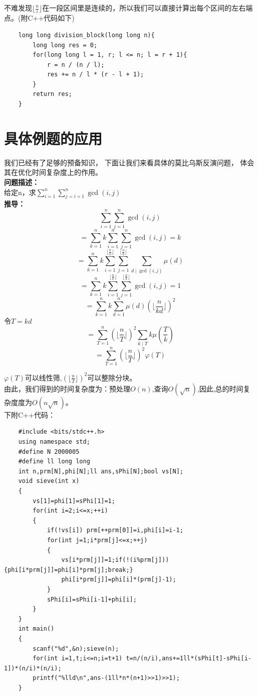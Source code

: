 \documentclass{hfutreport}
\begin{document}
不难发现$\lfloor \frac{n}{i} \rfloor$在一段区间里是连续的，所以我们可以直接计算出每个区间的左右端点。(附C++代码如下)\\
\begin{lstlisting}
    long long division_block(long long n){
        long long res = 0;
        for(long long l = 1, r; l <= n; l = r + 1){
            r = n / (n / l);
            res += n / l * (r - l + 1);
        }
        return res;
    }
\end{lstlisting}


\section{具体例题的应用}

我们已经有了足够的预备知识，
下面让我们来看具体的莫比乌斯反演问题，
体会其在优化时间复杂度上的作用。\\

\textbf{问题描述：}\\

给定n，求$\sum_{i=1}^{n}\sum_{j=i+1}^{n}\gcd(i,j)$\\

\textbf{推导：}\\
\[
    \sum_{i=1}^{n}\sum_{j=1}^{n}\gcd(i,j)
\]
\[
  =\sum_{k=1}^{n}k\sum_{i=1}^{n}\sum_{j=1}^{n}\gcd(i,j) = k  
\]
\[
  =\sum_{k=1}^{n}k\sum_{i=1}^{\lfloor \frac{n}{k}\rfloor}\sum_{j=1}^{\lfloor \frac{n}{k}\rfloor}\sum_{d \mid \gcd(i,j)}\mu(d)
\]
\[
  =\sum_{k=1}^{n}k\sum_{i=1}^{\lfloor \frac{n}{k}\rfloor}\sum_{j=1}^{\lfloor \frac{n}{k}\rfloor}\gcd(i,j)=1
\]
\[
  =\sum_{k=1}^{n}k\sum_{d=1}^{n}\mu(d)(\lfloor \frac{n}{kd}\rfloor )^{2}
\]
令$ T = kd$\\
\[
  =\sum_{T=1}^{n}(\lfloor \frac{n}{T}\rfloor )^{2}\sum_{k \mid T}k\mu(\frac{T}{k})
\]
\[
  =\sum_{T=1}^{n}(\lfloor \frac{n}{T}\rfloor )^{2}\varphi(T)
\]

$\varphi(T)$可以线性筛,$(\lfloor \frac{n}{T}\rfloor )^{2}$可以整除分块。\\

由此，我们得到的时间复杂度为：预处理$O(n)$,查询$O(\sqrt{n})$,因此,总的时间复杂度度为$O(n\sqrt{n})$。\\

下附C++代码：
\begin{lstlisting}
    #include <bits/stdc++.h>
    using namespace std;
    #define N 2000005
    #define ll long long
    int n,prm[N],phi[N];ll ans,sPhi[N];bool vs[N];
    void sieve(int x)
    {
        vs[1]=phi[1]=sPhi[1]=1;
        for(int i=2;i<=x;++i)
        {
            if(!vs[i]) prm[++prm[0]]=i,phi[i]=i-1;
            for(int j=1;i*prm[j]<=x;++j)
            {
                vs[i*prm[j]]=1;if(!(i%prm[j])) {phi[i*prm[j]]=phi[i]*prm[j];break;}
                phi[i*prm[j]]=phi[i]*(prm[j]-1);
            }
            sPhi[i]=sPhi[i-1]+phi[i];
        }
    }
    int main()
    {
        scanf("%d",&n);sieve(n);
        for(int i=1,t;i<=n;i=t+1) t=n/(n/i),ans+=1ll*(sPhi[t]-sPhi[i-1])*(n/i)*(n/i);
        printf("%lld\n",ans-(1ll*n*(n+1)>>1)>>1);
    }
\end{lstlisting}
\end{document}

